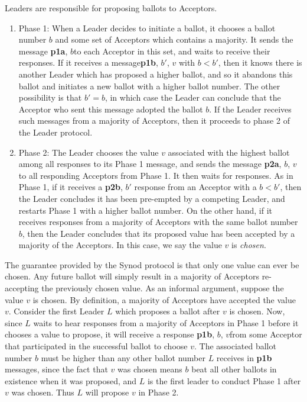 \documentclass{sig-alternate}
\begin{document}
Leaders are responsible for proposing ballots to Acceptors. 

\begin{enumerate}
	\item Phase 1: When a Leader decides to initiate a ballot, it chooses a ballot number $b$ and some set of Acceptors which contains a majority. It sends the message \textlangle \textbf{p1a}, $b$\textrangle to each Acceptor in this set, and waits to receive their responses. If it receives a message\textlangle \textbf{p1b}, $b'$, $v$ \textrangle with $b < b'$, then it knows there is another Leader which has proposed a higher ballot, and so it abandons this ballot and initiates a new ballot with a higher ballot number.
	The other possibility is that $b' = b$, in which case the Leader can conclude that the Acceptor who sent this message adopted the ballot $b$. If the Leader receives such messages from a majority of Acceptors, then it proceeds to phase 2 of the Leader protocol.
	
	\item Phase 2: The Leader chooses the value $v$ associated with the highest ballot among all responses to its Phase 1 message, and sends the message \textlangle \textbf{p2a}, $b$, $v$ \textrangle to all responding Acceptors from Phase 1. It then waits for responses.
	As in Phase 1, if it receives a \textlangle \textbf{p2b}, $b'$ \textrangle response from an Acceptor with a $b < b'$, then the Leader concludes it has been pre-empted by a competing Leader, and restarts Phase 1 with a higher ballot number.
	On the other hand, if it receives responses from a majority of Acceptors with the same ballot number $b$, then the Leader concludes that its proposed value has been accepted by a majority of the Acceptors. In this case, we say the value $v$ is \textit{chosen}.
\end{enumerate}

The guarantee provided by the Synod protocol is that only one value can ever be chosen. Any future ballot will simply result in a majority of Acceptors re-accepting the previously chosen value. As an informal argument, suppose the value $v$ is chosen. By definition, a majority of Acceptors have accepted the value $v$. Consider the first Leader $L$ which proposes a ballot after $v$ is chosen. Now, since $L$ waits to hear responses from a majority of Acceptors in Phase 1 before it chooses a value to propose, it will receive a response \textlangle \textbf{p1b}, $b$, $v$\textrangle from some Acceptor that participated in the successful ballot to choose $v$. The associated ballot number $b$ must be higher than any other ballot number $L$ receives in \textbf{p1b} messages, since the fact that $v$ was chosen means $b$ beat all other ballots in existence when it was proposed, and $L$ is the first leader to conduct Phase 1 after $v$ was chosen. Thus $L$ will propose $v$ in Phase 2.
\end{document}
